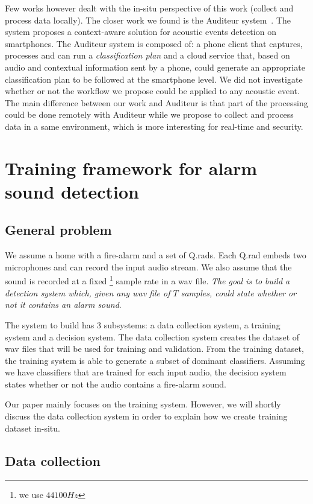\documentclass[10pt, conference, compsocconf]{IEEEtran}
\begin{document}
Few works however dealt with the in-situ perspective of this work (collect and process data locally). The closer work we found is the 
Auditeur system~\cite{Nirjon:2013:AMS:2462456.2464446}. The system proposes a context-aware solution for acoustic events detection on smartphones. 
The Auditeur system is composed of: a phone client that captures, processes and can run a {\it classification plan} and a cloud 
service that, based on audio and contextual information sent by a phone, could generate an appropriate classification plan to be 
followed at the smartphone level. We did not investigate whether or not the workflow we propose could be applied 
to any acoustic event. The main difference between our work and Auditeur is that part of the processing could be done 
remotely with Auditeur while we propose to collect and process 
data in a same environment, which is more interesting for real-time and security.

\section{Training framework for alarm sound detection } \label{Framework}
\subsection{General problem}

We assume a home with a fire-alarm and a set of Q.rads. Each Q.rad embeds two microphones and can record the input audio 
stream. We also assume that the sound is recorded at a fixed \footnote{we use $44100Hz$} sample rate in a wav file. {\it The goal is to build  a detection system which, given any wav file of $T$ samples, could state whether or not it contains an alarm sound}.

The system to build has $3$ subsystems: a data collection system, a training system and a decision system. 
The data collection system creates the dataset of wav files that will be used for training and validation. 
From the training dataset, the training system is able to generate a subset of dominant classifiers. Assuming we have classifiers that are trained for each input audio, the decision system states whether or not the audio contains a fire-alarm sound.

Our paper mainly focuses on the training system. However, we will shortly discuss the data collection system in order 
to explain how we create training dataset in-situ.

\subsection{Data collection}
\end{document}
